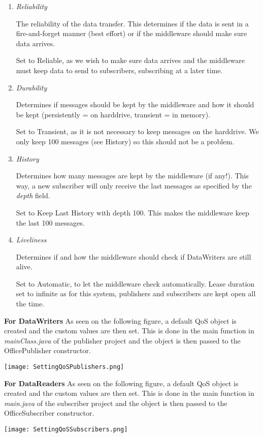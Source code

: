 \begin{enumerate}
\item \textit{Reliability}

The reliability of the data transfer. This determines if the data is sent in a fire-and-forget manner (best effort) or if the middleware should make sure data arrives.

Set to Reliable, as we wish to make sure data arrives and the middleware must keep data to send to subscribers, subscribing at a later time.

\item \textit{Durability}

Determines if messages should be kept by the middleware and how it should be kept (persistently = on harddrive, transient = in memory).

Set to Transient, as it is not necessary to keep messages on the harddrive. We only keep 100 messages (see History) so this should not be a problem.

\item \textit{History}

Determines how many messages are kept by the middleware (if any!). This way, a new subscriber will only receive the last messages as specified by the \textit{depth} field.

Set to Keep Last History with depth 100. This makes the middleware keep the last 100 messages. 

\item \textit{Liveliness}

Determines if and how the middleware should check if DataWriters are still alive. 

Set to Automatic, to let the middleware check automatically. Lease duration set to infinite as for this system, publishers and subscribers are kept open all the time.

\end{enumerate}

\textbf{For DataWriters}
As seen on the following figure, a default QoS object is created and the custom values are then set. This is done in the main function in \textit{mainClass.java} of the publisher project and the object is then passed to the OfficePublisher constructor.
\begin{center}
	\texttt{[image: SettingQoSPublishers.png]}
\end{center}

\textbf{For DataReaders}
As seen on the following figure, a default QoS object is created and the custom values are then set. This is done in the main function in \textit{main.java} of the subscriber project and the object is then passed to the OfficeSubscriber constructor.
\begin{center}
	\texttt{[image: SettingQoSSubscribers.png]}
\end{center}




